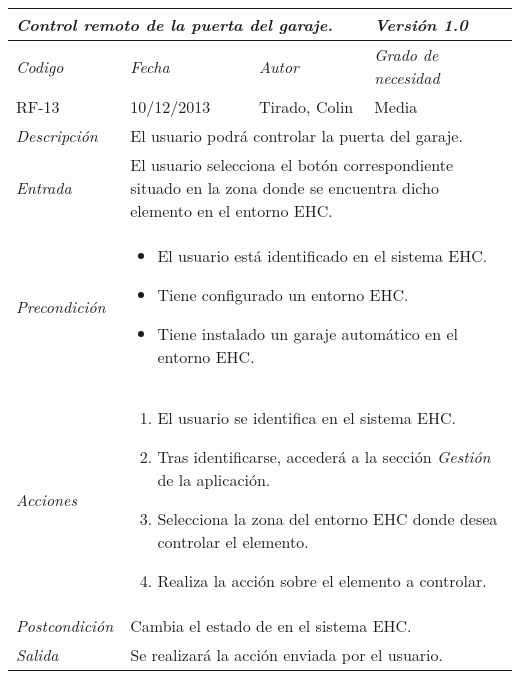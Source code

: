 \begin{tabular}{|p{3cm}|p{4cm}|p{4cm}|p{4cm}|}
\hline \multicolumn{3}{|p{9cm}|}{\textit{Control remoto de la puerta del garaje.}} & \textit{Versi\'on 1.0} \\
\hline \textit{Codigo} & \textit{Fecha} & \textit{Autor} & \textit{Grado de necesidad} \\
RF-13 & 10/12/2013 & Tirado, Colin & Media \\
\hline \textit{Descripci\'on} & \multicolumn{3}{|p{9cm}|}{El usuario podr\'a controlar la puerta del garaje.} \\
\hline \textit{Entrada} & \multicolumn{3}{|p{9cm}|}{El usuario selecciona el bot\'on correspondiente situado en la zona donde se encuentra dicho elemento en el entorno EHC.} \\
\hline \textit{Precondici\'on} & \multicolumn{3}{|p{9cm}|}{
\begin{itemize}
\item El usuario est\'a identificado en el sistema EHC.
\item Tiene configurado un entorno EHC.
\item Tiene instalado un garaje autom\'atico en el entorno EHC.
\end{itemize}
} \\
\hline \textit{Acciones} & \multicolumn{3}{|p{9cm}|}{
\begin{enumerate}
\item El usuario se identifica en el sistema EHC.
\item Tras identificarse, acceder\'a a la secci\'on \textit{Gesti\'on} de la aplicaci\'on.
\item Selecciona la zona del entorno EHC donde desea controlar el elemento.
\item Realiza la acci\'on sobre el elemento a controlar.
\end{enumerate}
} \\
\hline \textit{Postcondici\'on} & \multicolumn{3}{|p{9cm}|}{Cambia el estado de  en el sistema EHC.} \\
\hline \textit{Salida} & \multicolumn{3}{|p{9cm}|}{Se realizar\'a la acci\'on enviada por el usuario.} \\ \hline
\end{tabular}